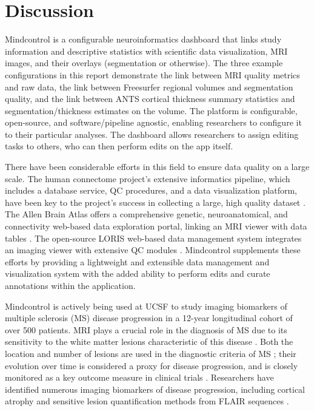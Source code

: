\section{Discussion}

Mindcontrol is a configurable neuroinformatics dashboard that links study information and descriptive statistics with scientific data visualization, MRI images, and their overlays (segmentation or otherwise). The three example configurations in this report demonstrate the link between MRI quality metrics and raw data, the link between Freesurfer regional volumes and segmentation quality, and the link between ANTS cortical thickness summary statistics and segmentation/thickness estimates on the volume. The platform is configurable, open-source, and software/pipeline agnostic, enabling researchers to configure it to their particular analyses. The dashboard allows researchers to assign editing tasks to others, who can then perform edits on the app itself. 

There have been considerable efforts in this field to ensure data quality on a large scale. The human connectome project's extensive informatics pipeline, which includes a database service, QC procedures, and a data visualization platform, have been key to the project's success in collecting a large, high quality dataset \cite{Marcus_2013}. The Allen Brain Atlas offers a comprehensive genetic, neuroanatomical, and connectivity web-based data exploration portal, linking an MRI viewer with data tables \cite{Sunkin_2012}. The open-source LORIS web-based data management system integrates an imaging viewer with extensive QC modules \cite{Das_2012}. Mindcontrol supplements these efforts by providing a lightweight and extensible data management and visualization system with the added ability to perform edits and curate annotations within the application. 

Mindcontrol is actively being used at UCSF to study imaging biomarkers of multiple sclerosis (MS) disease progression in a 12-year longitudinal cohort of over 500 patients. MRI plays a crucial role in the diagnosis of MS due to its sensitivity to the white matter lesions characteristic of this disease \cite{ge2006multiple}. Both the location and number of lesions are used in the diagnostic criteria of MS \cite{mcdonald2001recommended}; their evolution over time is considered a proxy for disease progression, and is closely monitored as a key outcome measure in clinical trials \cite{ge2000glatiramer}. Researchers have identified numerous imaging biomarkers of disease progression, including cortical atrophy \cite{fisher2008gray} and sensitive lesion quantification methods from FLAIR sequences \cite{Schmidt_2012}. 

